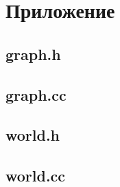 
\newpage
\section*{Приложение}
\subsection*{graph.h}
\fontsize{12}{8}\selectfont
\setcounter{page}{1}

  
\subsection*{graph.cc}
  
\subsection*{world.h}
  
\subsection*{world.cc}
  
